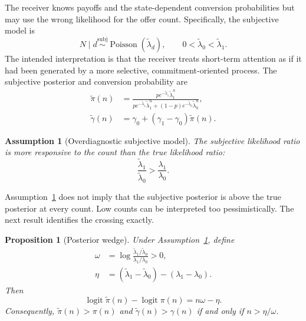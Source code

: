 \documentclass[11pt]{article}
\newtheorem{proposition}{Proposition}
\newtheorem{assumption}{Assumption}
\newcommand{\logit}{\operatorname{logit}}
\newcommand{\Pois}{\operatorname{Poisson}}
\begin{document}
The receiver knows payoffs and the state-dependent conversion probabilities but
may use the wrong likelihood for the offer count. Specifically, the subjective
model is
\begin{equation}
N\mid d\overset{\mathrm{subj}}{\sim}\Pois(\widetilde\lambda_d),
\qquad 0<\widetilde\lambda_0<\widetilde\lambda_1. \label{eq:subjective-poisson}
\end{equation}
The intended interpretation is that the receiver treats short-term attention as
if it had been generated by a more selective, commitment-oriented process. The
subjective posterior and conversion probability are
\begin{align}
\widetilde\pi(n)
&=\frac{p e^{-\widetilde\lambda_1}\widetilde\lambda_1^n}
{p e^{-\widetilde\lambda_1}\widetilde\lambda_1^n
+(1-p)e^{-\widetilde\lambda_0}\widetilde\lambda_0^n}, \label{eq:subjective-posterior}\\
\widetilde\gamma(n)
&=\gamma_0+(\gamma_1-\gamma_0)\widetilde\pi(n). \label{eq:subjective-gamma}
\end{align}

\begin{assumption}[Overdiagnostic subjective model]\label{ass:overdiagnostic}
The subjective likelihood ratio is more responsive to the count than the true
likelihood ratio:
\[
\frac{\widetilde\lambda_1}{\widetilde\lambda_0}
>
\frac{\lambda_1}{\lambda_0}.
\]
\end{assumption}

Assumption~\ref{ass:overdiagnostic} does not imply that the subjective posterior
is above the true posterior at every count. Low counts can be interpreted too
pessimistically. The next result identifies the crossing exactly.

\begin{proposition}[Posterior wedge]\label{prop:wedge}
Under Assumption~\ref{ass:overdiagnostic}, define
\begin{align*}
\omega
&=\log\frac{\widetilde\lambda_1/\widetilde\lambda_0}
{\lambda_1/\lambda_0}>0,\\
\eta
&=(\widetilde\lambda_1-\widetilde\lambda_0)
-(\lambda_1-\lambda_0).
\end{align*}
Then
\begin{equation}
\logit\widetilde\pi(n)-\logit\pi(n)=n\omega-\eta. \label{eq:wedge}
\end{equation}
Consequently, $\widetilde\pi(n)>\pi(n)$ and
$\widetilde\gamma(n)>\gamma(n)$ if and only if $n>\eta/\omega$.
\end{proposition}
\end{document}
